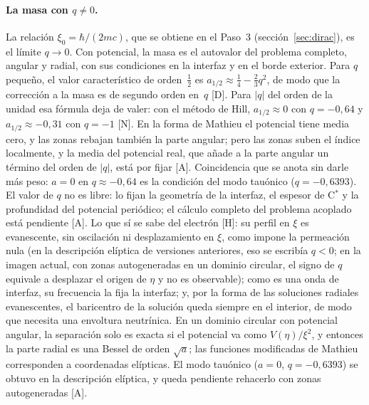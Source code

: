 \documentclass[11pt,a4paper]{article}
\newcommand{\st}[1]{\textup{[#1]}}
\newcommand{\Cst}{C\ensuremath{^{*}}}
\newcommand{\apartado}[1]{\paragraph{#1}}
\begin{document}
\apartado{La masa con $q\neq0$.} La relación $\xi_0=\hbar/(2mc)$, que se obtiene en el Paso~3 (sección~\ref{sec:dirac}), es el límite $q\to0$. Con potencial, la masa es el autovalor del problema completo, angular y radial, con sus condiciones en la interfaz y en el borde exterior. Para $q$ pequeño, el valor característico de orden~$\tfrac12$ es $a_{1/2}\approx\tfrac14-\tfrac23q^2$, de modo que la corrección a la masa es de segundo orden en~$q$ \st{D}. Para $|q|$ del orden de la unidad esa fórmula deja de valer: con el método de Hill, $a_{1/2}\approx0$ con $q=-0{,}64$ y $a_{1/2}\approx-0{,}31$ con $q=-1$ \st{N}. En la forma de Mathieu el potencial tiene media cero, y las zonas rebajan también la parte angular; pero las zonas suben el índice localmente, y la media del potencial real, que añade a la parte angular un término del orden de $|q|$, está por fijar \st{A}. Coincidencia que se anota sin darle más peso: $a=0$ en $q\approx-0{,}64$ es la condición del modo tauónico ($q=-0{,}6393$). El valor de $q$ no es libre: lo fijan la geometría de la interfaz, el espesor de \Cst{} y la profundidad del potencial periódico; el cálculo completo del problema acoplado está pendiente \st{A}. Lo que sí se sabe del electrón \st{H}: su perfil en $\xi$ es evanescente, sin oscilación ni desplazamiento en $\xi$, como impone la permeación nula (en la descripción elíptica de versiones anteriores, eso se escribía $q<0$; en la imagen actual, con zonas autogeneradas en un dominio circular, el signo de $q$ equivale a desplazar el origen de $\eta$ y no es observable); como es una onda de interfaz, su frecuencia la fija la interfaz; y, por la forma de las soluciones radiales evanescentes, el baricentro de la solución queda siempre en el interior, de modo que necesita una envoltura neutrínica. En un dominio circular con potencial angular, la separación solo es exacta si el potencial va como $V(\eta)/\xi^2$, y entonces la parte radial es una Bessel de orden $\sqrt{a}$; las funciones modificadas de Mathieu corresponden a coordenadas elípticas. El modo tauónico ($a=0$, $q=-0{,}6393$) se obtuvo en la descripción elíptica, y queda pendiente rehacerlo con zonas autogeneradas \st{A}.
\end{document}
